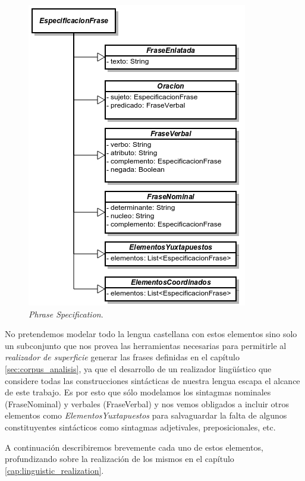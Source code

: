 \begin{figure}[H]
  	\centering
	\includegraphics[scale=0.7]{img/phrase_spec.png}
	\caption{\textit{Phrase Specification}.}
  	\label{fig:phase_spec}
\end{figure}

No pretendemos modelar todo la lengua castellana con estos elementos sino solo un subconjunto que nos provea las herramientas necesarias para permitirle al \emph{realizador de superficie} generar las frases definidas en el capítulo \ref{sec:corpus_analisis}, ya que el desarrollo de un realizador lingüístico que considere todas las construcciones sintácticas de nuestra lengua escapa el alcance de este trabajo. Es por esto que sólo modelamos los sintagmas nominales (FraseNominal) y verbales (FraseVerbal) y nos vemos obligados a incluir otros elementos como \emph{ElementosYuxtapuestos} para salvaguardar la falta de algunos constituyentes sintácticos como sintagmas adjetivales, preposicionales, etc. 

A continuación describiremos brevemente cada uno de estos elementos, profundizando sobre la realización de los mismos en el capítulo \ref{cap:linguistic_realization}.



